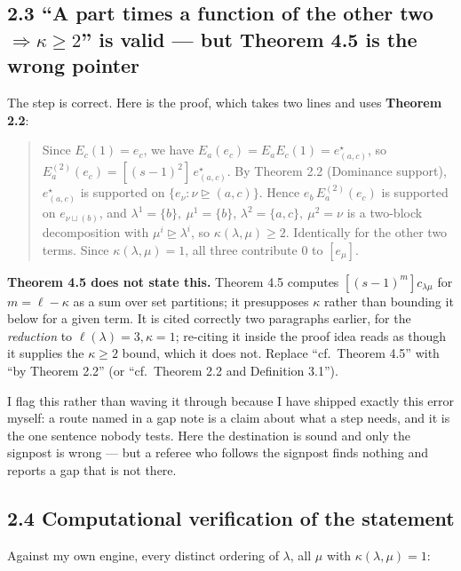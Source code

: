 \documentclass[11pt]{article}
\begin{document}
\subsection*{2.3 ``A part times a function of the other two $\Rightarrow\kappa\ge2$'' is valid
--- but Theorem 4.5 is the wrong pointer}

The step is correct. Here is the proof, which takes two lines and uses \textbf{Theorem 2.2}:
\begin{quote}
Since $E_c(1)=e_c$, we have $E_a(e_c)=E_aE_c(1)=e^\star_{(a,c)}$, so
$E_a^{(2)}(e_c)=[(s-1)^2]\,e^\star_{(a,c)}$. By Theorem 2.2 (Dominance support),
$e^\star_{(a,c)}$ is supported on $\{e_\nu:\nu\trianglerighteq(a,c)\}$. Hence
$e_b\,E_a^{(2)}(e_c)$ is supported on $e_{\nu\sqcup(b)}$, and
$\lambda^1=\{b\},\ \mu^1=\{b\}$, $\lambda^2=\{a,c\},\ \mu^2=\nu$ is a two-block decomposition
with $\mu^i\trianglerighteq\lambda^i$, so $\kappa(\lambda,\mu)\ge2$. Identically for the other
two terms. Since $\kappa(\lambda,\mu)=1$, all three contribute $0$ to $[e_\mu]$.
\end{quote}
\textbf{Theorem 4.5 does not state this.} Theorem 4.5 computes $[(s-1)^m]c_{\lambda\mu}$ for
$m=\ell-\kappa$ as a sum over set partitions; it presupposes $\kappa$ rather than bounding it
below for a given term. It is cited correctly two paragraphs earlier, for the \emph{reduction} to
$\ell(\lambda)=3,\kappa=1$; re-citing it inside the proof idea reads as though it supplies the
$\kappa\ge2$ bound, which it does not. Replace ``cf.\ Theorem 4.5'' with ``by Theorem 2.2''
(or ``cf.\ Theorem 2.2 and Definition 3.1'').

I flag this rather than waving it through because I have shipped exactly this error myself: a
route named in a gap note is a claim about what a step needs, and it is the one sentence nobody
tests. Here the destination is sound and only the signpost is wrong --- but a referee who follows
the signpost finds nothing and reports a gap that is not there.

\subsection*{2.4 Computational verification of the statement}

Against my own engine, every distinct ordering of $\lambda$, all $\mu$ with
$\kappa(\lambda,\mu)=1$:
\end{document}
